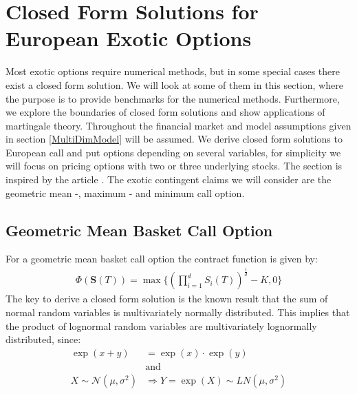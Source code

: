 \section{Closed Form Solutions for European Exotic Options}\label{ExoticEuro}
Most exotic options require numerical methods, but in some special cases there exist a closed form solution. We will look at some of them in this section, where the purpose is to provide benchmarks for the numerical methods. Furthermore, we explore the boundaries of closed form solutions and show applications of martingale theory. Throughout the financial market and model assumptions given in section \ref{MultiDimModel} will be assumed. We derive closed form solutions to European call and put options depending on several variables, for simplicity we will focus on pricing options with two or three underlying stocks. The section is inspired by the article \parencite{Ouwehand2006}. The exotic contingent claims we will consider are the geometric mean -, maximum - and minimum call option.

\subsection{Geometric Mean Basket Call Option}\label{GeoBasket}
For a geometric mean basket call option the contract function is given by:
\begin{align*}
\Phi(\bm{S}(T))=\max\{ (\prod_{i=1}^{d} S_i(T))^{\frac{1}{d}}-K,0 \}
\end{align*}
The key to  derive a closed form solution is the known result that the sum of normal random variables is multivariately normally distributed.
This implies that the product of lognormal random variables are multivariately lognormally distributed, since: 
\begin{equation*}
\begin{split}
\exp(x+y)&=\exp(x)\cdot \exp(y) \\
& \text{and}\\
 X \sim \mathcal{N}(\mu,\sigma^2) & \Rightarrow Y = \exp(X)\sim LN(\mu, \sigma^2)
\end{split}
\end{equation*}

